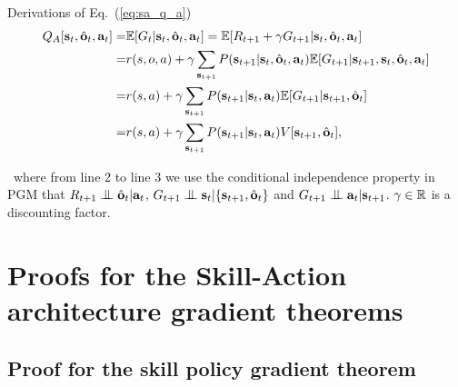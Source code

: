Derivations of Eq.~(\ref{eq:sa_q_a})
\begin{align*}
  Q_A[ {\mathbf{s}}_t,\hat{{\mathbf{o}}}_t,{\mathbf{a}}_t]=&\mathbb{E}[G_t| {\mathbf{s}}_t,\hat{{\mathbf{o}}}_t,{\mathbf{a}}_t]
                               =\mathbb{E}[R_{t+1}+\gamma G_{t+1}| {\mathbf{s}}_t,\hat{{\mathbf{o}}}_t,{\mathbf{a}}_t]\\
  =& r(s,o,a) + \gamma\sum_{{\mathbf{s}}_{t+1}}P({\mathbf{s}}_{t+1}|{\mathbf{s}}_t,\hat{{\mathbf{o}}}_t,{\mathbf{a}}_t)\mathbb{E}[G_{t+1}|{\mathbf{s}}_{t+1},{\mathbf{s}}_t,\hat{{\mathbf{o}}}_t,{\mathbf{a}}_t]\\
  =& r(s,a) + \gamma\sum_{{\mathbf{s}}_{t+1}}P({\mathbf{s}}_{t+1}|{\mathbf{s}}_t,{\mathbf{a}}_t)\mathbb{E}[G_{t+1}|{\mathbf{s}}_{t+1},\hat{{\mathbf{o}}}_t]\\
  =& r(s,a) + \gamma\sum_{{\mathbf{s}}_{t+1}}P({\mathbf{s}}_{t+1}|{\mathbf{s}}_t,{\mathbf{a}}_t)V[{\mathbf{s}}_{t+1},\hat{{\mathbf{o}}}_t],
\end{align*}

~where from line 2 to line 3 we use the conditional independence
property in PGM that $R_{t+1}\bigCI\hat{\rvo}_{t}|\rva_t$,
$G_{t+1}\bigCI\rvs_{t}|\{\rvs_{t+1},\hat{\rvo}_t\}$ and
$G_{t+1}\bigCI\rva_{t}|\rvs_{t+1}$. $\gamma \in {\mathbb{R}}$ is a
discounting factor.


\section{Proofs for the Skill-Action architecture gradient
  theorems}
\label{sec:appen_sa_proof}

\subsection{Proof for the skill policy gradient theorem}
\label{sec:appen_sa_o_grad}

